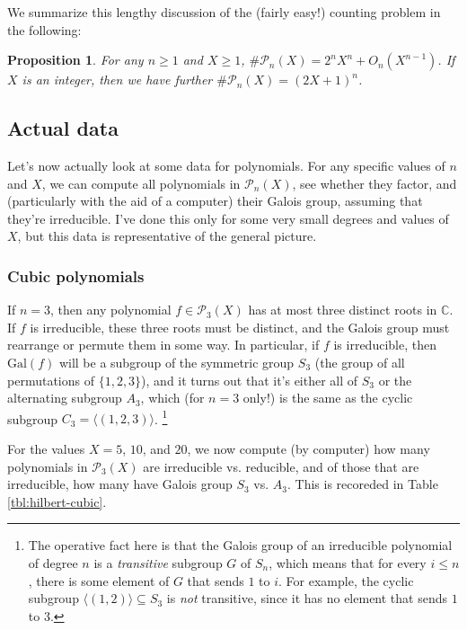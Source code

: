 \documentclass[12pt]{amsart}
\newtheorem{proposition}[theorem]{Proposition}
\theoremstyle{definition} \newtheorem*{notation}{Notation}
\theoremstyle{remark} \newtheorem*{remark}{Remark}
\theoremstyle{remark} \newtheorem*{example}{Example}
\theoremstyle{definition} \newtheorem*{definition}{Definition}
\numberwithin{equation}{section}
\numberwithin{theorem}{section}
\begin{document}
	We summarize this lengthy discussion of the (fairly easy!) counting problem in the following:
	
	\begin{proposition}
		For any $n \geq 1$ and $X \geq 1$, $\#\mathcal{P}_n(X) = 2^n X^n + O_n(X^{n-1})$.  If $X$ is an integer, then we have further $\#\mathcal{P}_n(X) = (2X+1)^n$.
	\end{proposition}
	
	\subsection{Actual data}
	
	Let's now actually look at some data for polynomials.  For any specific values of $n$ and $X$, we can compute all polynomials in $\mathcal{P}_n(X)$, see whether they factor, and (particularly with the aid of a computer) their Galois group, assuming that they're irreducible.  I've done this only for some very small degrees and values of $X$, but this data is representative of the general picture.
	
	\subsubsection{Cubic polynomials}  If $n=3$, then any polynomial $f \in \mathcal{P}_3(X)$ has at most three distinct roots in $\mathbb{C}$.  If $f$ is irreducible, these three roots must be distinct, and the Galois group must rearrange or permute them in some way.  In particular, if $f$ is irreducible, then $\mathrm{Gal}(f)$ will be a subgroup of the symmetric group $S_3$ (the group of all permutations of $\{1,2,3\}$), and it turns out that it's either all of $S_3$ or the alternating subgroup $A_3$, which (for $n=3$ only!) is the same as the cyclic subgroup $C_3 = \langle (1,2,3) \rangle$. \footnote{The operative fact here is that the Galois group of an irreducible polynomial of degree $n$ is a \emph{transitive} subgroup $G$ of $S_n$, which means that for every $i \leq n$, there is some element of $G$ that sends $1$ to $i$.  For example, the cyclic subgroup $\langle (1,2) \rangle \subseteq S_3$ is \emph{not} transitive, since it has no element that sends $1$ to $3$.}
	
	For the values $X=5$, $10$, and $20$, we now compute (by computer) how many polynomials in $\mathcal{P}_3(X)$ are irreducible vs. reducible, and of those that are irreducible, how many have Galois group $S_3$ vs. $A_3$.  This is recoreded in Table \ref{tbl:hilbert-cubic}.
	
\end{document}
